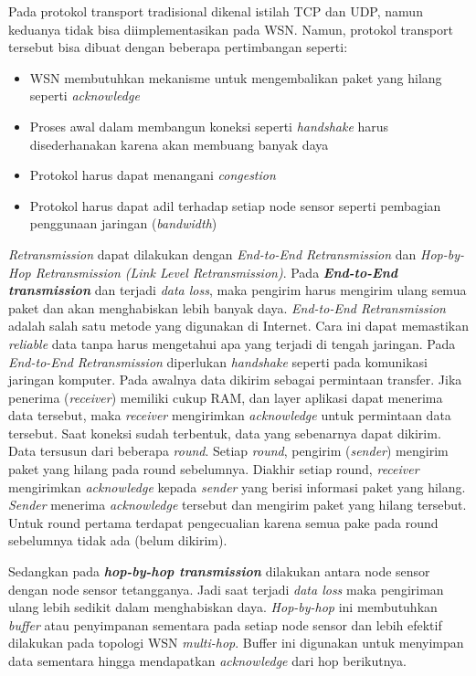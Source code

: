 Pada protokol transport tradisional dikenal istilah TCP dan UDP, namun keduanya tidak bisa diimplementasikan pada WSN. Namun, protokol transport tersebut bisa dibuat dengan beberapa pertimbangan seperti:
\begin{itemize}
	\item WSN membutuhkan mekanisme untuk mengembalikan paket yang hilang seperti \textit{acknowledge}
	\item Proses awal dalam membangun koneksi seperti \textit{handshake} harus disederhanakan karena akan membuang banyak daya
	\item Protokol harus dapat menangani \textit{congestion}
	\item Protokol harus dapat adil terhadap setiap node sensor seperti pembagian penggunaan jaringan (\textit{bandwidth})
\end{itemize} 

\textit{Retransmission} dapat dilakukan dengan \textit{End-to-End Retransmission} dan \textit{Hop-by-Hop Retransmission (Link Level Retransmission)}. Pada \textbf{\textit{End-to-End transmission}} dan terjadi \textit{data loss}, maka pengirim harus mengirim ulang semua paket dan akan menghabiskan lebih banyak daya. \textit{End-to-End Retransmission} adalah salah satu metode yang digunakan di Internet. Cara ini dapat memastikan \textit{reliable} data tanpa harus mengetahui apa yang terjadi di tengah jaringan. Pada \textit{End-to-End Retransmission} diperlukan \textit{handshake} seperti pada komunikasi jaringan komputer. Pada awalnya data dikirim sebagai permintaan transfer. Jika penerima (\textit{receiver}) memiliki cukup RAM, dan layer aplikasi dapat menerima data tersebut, maka \textit{receiver} mengirimkan \textit{acknowledge} untuk permintaan data tersebut. Saat koneksi sudah terbentuk, data yang sebenarnya dapat dikirim. Data tersusun dari beberapa \textit{round}. Setiap \textit{round}, pengirim (\textit{sender}) mengirim paket yang hilang pada round sebelumnya. Diakhir setiap  round, \textit{receiver} mengirimkan \textit{acknowledge} kepada \textit{sender} yang berisi informasi paket yang hilang. \textit{Sender} menerima \textit{acknowledge} tersebut dan mengirim paket yang hilang tersebut. Untuk round pertama terdapat pengecualian karena semua pake pada round sebelumnya tidak ada (belum dikirim). 

Sedangkan pada \textbf{\textit{hop-by-hop transmission}} dilakukan antara node sensor dengan node sensor tetangganya. Jadi saat terjadi \textit{data loss} maka pengiriman ulang lebih sedikit dalam menghabiskan daya. \textit{Hop-by-hop} ini membutuhkan \textit{buffer} atau penyimpanan sementara pada setiap node sensor dan lebih efektif dilakukan pada topologi WSN \textit{multi-hop}. Buffer ini digunakan untuk menyimpan data sementara hingga mendapatkan \textit{acknowledge} dari hop berikutnya.

